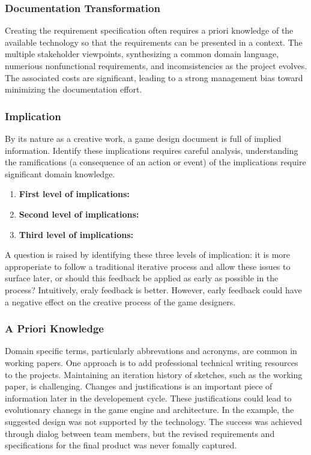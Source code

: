     \subsubsection*{Documentation Transformation}
    Creating the requirement specification often requires a priori knowledge of the available technology so that the requirements can be presented in a context. The multiple stakeholder viewpoints, synthesizing a common domain language, numerious nonfunctional requirements, and incomsistencies as the project evolves. The associated costs are significant, leading to a strong management bias toward minimizing the documentation effort.

    \subsubsection*{Implication}
    By its nature as a creative work, a game design document is full of
    implied information. Identify these implications requires careful analysis, understanding the ramifications (a consequence of an action or event) of the implications require significant domain knowledge. 

    \begin{enumerate}
      \item {\bf First level of implications:}
      \item {\bf Second level of implications:}
      \item {\bf Third level of implications:}
    \end{enumerate}

    A question is raised by identifying these three levels of implication: it is more approperiate to follow a traditional iterative process and allow these issues to surface later, or should this feedback be applied as early as possible in the process? Intuitively, eraly feedback is better. However, early feedback could have a negative effect on the creative process of the game designers. 

    \subsubsection*{A Priori Knowledge}
    Domain specific terms, particularly abbrevations and acronyms, are common in working papers.
    One approach is to add professional technical writing resources to the projects. Maintaining an iteration history of sketches, such as the working paper, is challenging. Changes and justifications is an important piece of information later in the developement cycle. These justifications could lead to evolutionary chanegs in the game engine and architecture. 
    In the example, the suggested design was not supported by the technology. The success was achieved through dialog between team members, but the revised requirements and specifications for the final product was never fomally captured. 

